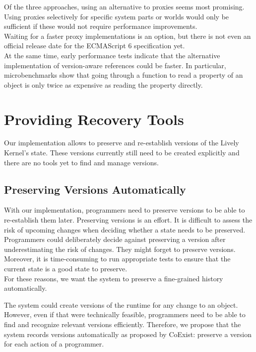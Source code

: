 Of the three approaches, using an alternative to proxies seems most promising.\\
Using proxies selectively for specific system parts or worlds would only be sufficient if these would not require performance improvements.\\
Waiting for a faster proxy implementations is an option, but there is not even an official release date for the ECMAScript 6 specification yet.\\
At the same time, early performance tests indicate that the alternative implementation of version-aware references could be faster.
In particular, microbenchmarks show that going through a function to read a property of an object is only twice as expensive as reading the property directly.


\section{Providing Recovery Tools}

Our implementation allows to preserve and re-establish versions of the Lively Kernel's state.
These versions currently still need to be created explicitly and there are no tools yet to find and manage versions.


\subsection{Preserving Versions Automatically}

With our implementation, programmers need to preserve versions to be able to re-establish them later.
Preserving versions is an effort.
It is difficult to assess the risk of upcoming changes when deciding whether a state needs to be preserved.
Programmers could deliberately decide against preserving a version after underestimating the risk of changes.
They might forget to preserve versions.
Moreover, it is time-consuming to run appropriate tests to ensure that the current state is a good state to preserve.\\
For these reasons, we want the system to preserve a fine-grained history automatically.

The system could create versions of the runtime for any change to an object.
However, even if that were technically feasible, programmers need to be able to find and recognize relevant versions efficiently.
Therefore, we propose that the system records versions automatically as proposed by CoExist: preserve a version for each action of a programmer.

